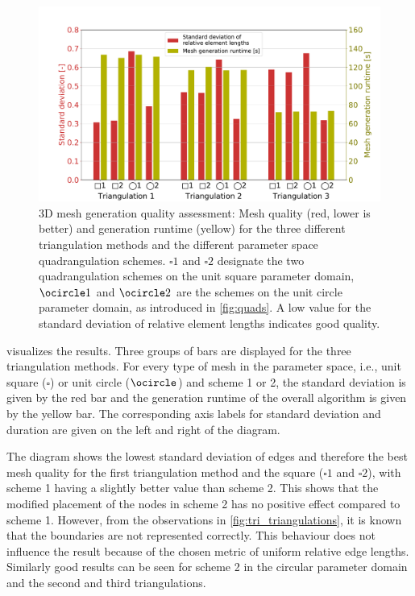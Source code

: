 \begin{figure}%
  \centering%
  \includegraphics[width=\textwidth]{images/fiber_creation/mesh_quality.pdf}%
  \caption{3D mesh generation quality assessment: Mesh quality (red, lower is better) and generation runtime (yellow) for the three different triangulation methods and the different parameter space quadrangulation schemes. $\square 1$ and $\square 2$ designate the two quadrangulation schemes on the unit square parameter domain, $\ocircle 1$ and $\ocircle 2$ are the schemes on the unit circle parameter domain, as introduced in \cref{fig:quads}. A low value for the standard deviation of relative element lengths indicates good quality.}%
  \label{fig:mesh_quality}%
\end{figure}

 visualizes the results. Three groups of bars are displayed for the three triangulation methods. For every type of mesh in the parameter space, i.e., unit square ($\square$) or unit circle ($\ocircle$) and scheme 1 or 2, the standard deviation is given by the red bar and the generation runtime of the overall algorithm is given by the yellow bar. The corresponding axis labels for standard deviation and duration are given on the left and right of the diagram.

The diagram shows the lowest standard deviation of edges and therefore the best mesh quality for the first triangulation method and the square ($\square 1$ and $\square 2$), with scheme 1 having a slightly better value than scheme 2. This shows that the modified placement of the nodes in scheme 2 has no positive effect compared to scheme 1.
However, from the observations in \cref{fig:tri_triangulations}, it is known that the boundaries are not represented correctly.
This behaviour does not influence the result because of the chosen metric of uniform relative edge lengths.
Similarly good results can be seen for scheme 2 in the circular parameter domain and the second and third triangulations.

